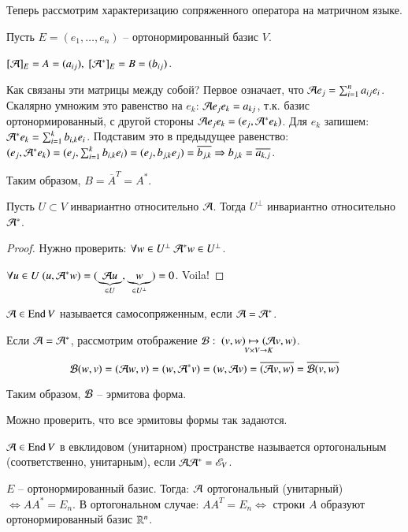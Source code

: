 \documentclass[main]{subfiles}
\begin{document}
Теперь рассмотрим характеризацию сопряженного оператора на матричном языке.

Пусть $E = (e_1, \ldots, e_n)$ -- ортонормированный базис $V$.

$[\mathcal{A}]_E = A = (a_{ij}), \ [\mathcal{A}^*]_E = B = (b_{ij})$.

Как связаны эти матрицы между собой?
Первое означает, что $\mathcal{A} e_j = \sum_{i=1}^n a_{ij} e_i$. Скалярно умножим это равенство на $e_k$:
$\mathcal{A} e_j e_k = a_{kj}$, т.к. базис ортонормированный, с другой стороны $\mathcal{A} e_j e_k = (e_j, \mathcal{A}^* e_k)$.
Для $e_k$ запишем: $\mathcal{A}^* e_k = \sum_{i=1}^k b_{i, k} e_i$. Подставим это в предыдущее равенство:
$(e_j, \mathcal{A}^* e_k) = (e_j, \sum_{i=1}^k b_{i, k} e_i) = (e_j, b_{j, k} e_j) = \overline{b_{j, k}} \Rightarrow
    b_{j, k} = \overline{a_{k, j}}$.

Таким образом, $B = \overline{A}^T = A^*$.

\begin{proposition}
    Пусть $U \subset V$ инвариантно относительно $\mathcal{A}$. Тогда $U^{\perp}$ инвариантно относительно $\mathcal{A}^*$.
\end{proposition}

\begin{proof}
    Нужно проверить: $\forall w \in U^{\perp} \ \mathcal{A}^* w \in U^{\perp}$.

    $\forall u \in U \ (u, \mathcal{A}^* w) = (\underbrace{\mathcal{A} u}_{\in U}, \underbrace{w}_{\in U^{\perp}}) = 0$. Voila!
\end{proof}

\begin{definition}
    $\mathcal{A} \in \operatorname{End} V$ называется самосопряженным, если $\mathcal{A} = \mathcal{A}^*$.
\end{definition}

Если  $\mathcal{A} = \mathcal{A}^*$, рассмотрим отображение $\mathcal{B}: \ \underset{V\times V \rightarrow K}{(v, w) \mapsto (\mathcal{A} v, w)}$.
\[\mathcal{B}(w, v) = (\mathcal{A} w, v) = (w, \mathcal{A}^* v) = (w, \mathcal{A} v) = \overline{(\mathcal{A} v, w)} = \overline{\mathcal{B}( v, w)}\]

Таким образом, $\mathcal{B}$ -- эрмитова форма.

Можно проверить, что все эрмитовы формы так задаются.

\begin{definition}
    $\mathcal{A} \in \operatorname{End} V$ в евклидовом (унитарном) пространстве называется ортогональным (соответственно, унитарным),
    если $\mathcal{A} \mathcal{A}^* = \mathscr{E}_V$.
\end{definition}

$E$ -- ортонормированный базис. Тогда: $\mathcal{A}$ ортогональный (унитарный) $\Leftrightarrow AA^* = E_n$.
В ортогональном случае: $AA^T = E_n \Leftrightarrow$ строки $A$ образуют ортонормированный базис $\mathbb{R}^n$.
\end{document}
